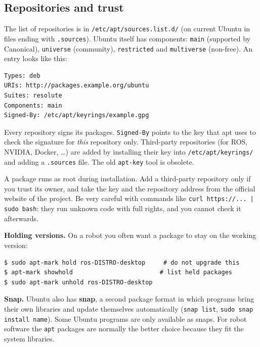 \subsection*{Repositories and trust}
The list of repositories is in \texttt{/etc/apt/sources.list.d/} (on current Ubuntu in files ending with \texttt{.sources}). Ubuntu itself has components: \texttt{main} (supported by Canonical), \texttt{universe} (community), \texttt{restricted} and \texttt{multiverse} (non-free). An entry looks like this:
\begin{verbatim}
Types: deb
URIs: http://packages.example.org/ubuntu
Suites: resolute
Components: main
Signed-By: /etc/apt/keyrings/example.gpg
\end{verbatim}
Every repository signs its packages. \texttt{Signed-By} points to the key that apt uses to check the signature for \emph{this} repository only. Third-party repositories (for ROS, NVIDIA, Docker, \dots) are added by installing their key into \texttt{/etc/apt/keyrings/} and adding a \texttt{.sources} file. The old \texttt{apt-key} tool is obsolete.

\begin{keyidea}
A package runs as root during installation. Add a third-party repository only if you trust its owner, and take the key and the repository address from the official website of the project. Be very careful with commands like \verb!curl https://... | sudo bash!: they run unknown code with full rights, and you cannot check it afterwards.
\end{keyidea}

\textbf{Holding versions.} On a robot you often want a package to stay on the working version:
\begin{verbatim}
$ sudo apt-mark hold ros-DISTRO-desktop     # do not upgrade this
$ apt-mark showhold                        # list held packages
$ sudo apt-mark unhold ros-DISTRO-desktop
\end{verbatim}
\textbf{Snap.} Ubuntu also has \textbf{snap}, a second package format in which programs bring their own libraries and update themselves automatically (\verb|snap list|, \verb|sudo snap install name|). Some Ubuntu programs are only available as snaps. For robot software the \texttt{apt} packages are normally the better choice because they fit the system libraries.

